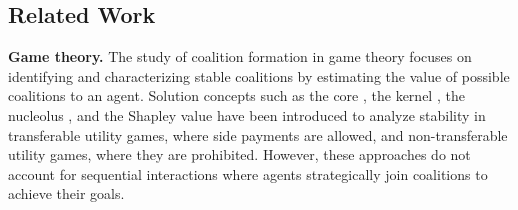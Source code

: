 \subsection{Related Work} 

\textbf{Game theory.} 
The study of coalition formation in game theory focuses on identifying and characterizing stable coalitions by estimating the value of possible coalitions to an agent.
Solution concepts such as the core \citep{arnold2002dynamic}, the kernel \citep{shehory1996kernel}, the nucleolus \citep{montero2006noncooperative}, and the Shapley value \citep{aumann2003endogenous} have been introduced to analyze stability in transferable utility games, where side payments are allowed, and non-transferable utility games, where they are prohibited. 
However, these approaches do not account for sequential interactions where agents strategically join coalitions to achieve their goals.

